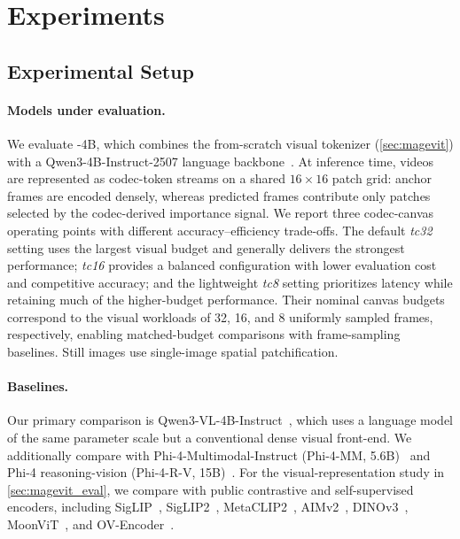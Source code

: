 \section{Experiments}
\label{sec:experiments}

\subsection{Experimental Setup}
\label{sec:exp_setup}


\paragraph{Models under evaluation.}
We evaluate \magevl-4B, which combines the from-scratch \magevit visual tokenizer (\cref{sec:magevit}) with a Qwen3-4B-Instruct-2507 language backbone~\citep{qwen3}. At inference time, videos are represented as codec-token streams on a shared $16{\times}16$ patch grid: anchor frames are encoded densely, whereas predicted frames contribute only patches selected by the codec-derived importance signal. We report three codec-canvas operating points with different accuracy--efficiency trade-offs. The default \emph{tc32} setting uses the largest visual budget and generally delivers the strongest performance; \emph{tc16} provides a balanced configuration with lower evaluation cost and competitive accuracy; and the lightweight \emph{tc8} setting prioritizes latency while retaining much of the higher-budget performance. Their nominal canvas budgets correspond to the visual workloads of 32, 16, and 8 uniformly sampled frames, respectively, enabling matched-budget comparisons with frame-sampling baselines.
Still images use single-image spatial patchification.



\paragraph{Baselines.}
Our primary comparison is Qwen3-VL-4B-Instruct~\citep{qwen3vl}, which uses a language model of the same parameter scale but a conventional dense visual front-end. We additionally compare with Phi-4-Multimodal-Instruct (Phi-4-MM, 5.6B)~\citep{abdin2024phi4} and Phi-4 reasoning-vision (Phi-4-R-V, 15B)~\citep{aneja2026phi4reasoningvision15btechnicalreport}. For the visual-representation study in \cref{sec:magevit_eval}, we compare \magevit with public contrastive and self-supervised encoders, including SigLIP~\citep{zhai2023siglip}, SigLIP2~\citep{tschannen2025siglip}, MetaCLIP2~\citep{model_metaclip2}, AIMv2~\citep{model_aimv2}, DINOv3~\citep{model_dinov3}, MoonViT~\citep{model_moonvit}, and OV-Encoder~\citep{ovencoder2026}.


